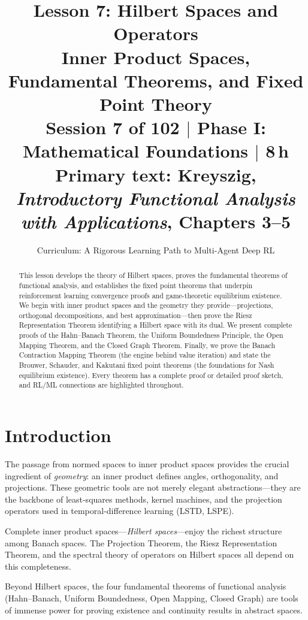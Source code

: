 \documentclass[11pt,a4paper]{article}
\title{\textbf{Lesson 7: Hilbert Spaces and Operators}\\[10pt]
\large Inner Product Spaces, Fundamental Theorems, and Fixed Point Theory\\[5pt]
\normalsize Session 7 of 102 $\mid$ Phase I: Mathematical Foundations $\mid$ 8\,h\\
\normalsize Primary text: Kreyszig, \emph{Introductory Functional Analysis with Applications}, Chapters 3--5}
\author{Curriculum: A Rigorous Learning Path to Multi-Agent Deep RL}
\date{}
\theoremstyle{definition}
\theoremstyle{plain}
\theoremstyle{remark}
\begin{document}
\maketitle

\begin{abstract}
This lesson develops the theory of Hilbert spaces, proves the fundamental theorems
of functional analysis, and establishes the fixed point theorems that underpin
reinforcement learning convergence proofs and game-theoretic equilibrium existence.
We begin with inner product spaces and the geometry they provide---projections,
orthogonal decompositions, and best approximation---then prove the Riesz
Representation Theorem identifying a Hilbert space with its dual. We present
complete proofs of the Hahn--Banach Theorem, the Uniform Boundedness Principle,
the Open Mapping Theorem, and the Closed Graph Theorem. Finally, we prove the
Banach Contraction Mapping Theorem (the engine behind value iteration) and state
the Brouwer, Schauder, and Kakutani fixed point theorems (the foundations for
Nash equilibrium existence). Every theorem has a complete proof or detailed
proof sketch, and RL/ML connections are highlighted throughout.
\end{abstract}

\tableofcontents
\newpage

\section{Introduction}\label{sec:introduction}

The passage from normed spaces to inner product spaces provides the crucial
ingredient of \emph{geometry}: an inner product defines angles, orthogonality,
and projections. These geometric tools are not merely elegant abstractions---they
are the backbone of least-squares methods, kernel machines, and the projection
operators used in temporal-difference learning (LSTD, LSPE).

Complete inner product spaces---\emph{Hilbert spaces}---enjoy the richest
structure among Banach spaces. The Projection Theorem, the Riesz Representation
Theorem, and the spectral theory of operators on Hilbert spaces all depend on
this completeness.

Beyond Hilbert spaces, the four fundamental theorems of functional analysis
(Hahn--Banach, Uniform Boundedness, Open Mapping, Closed Graph) are tools
of immense power for proving existence and continuity results in abstract spaces.
\end{document}
